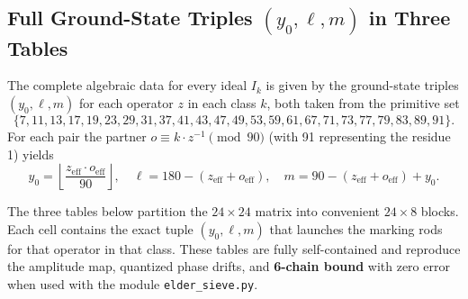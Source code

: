 \documentclass[11pt,a4paper]{article}
\begin{document}
\subsection{Full Ground-State Triples \((y_0, \ell, m)\) in Three  \) Tables}

The complete algebraic data for every ideal \(I_k\) is given by the ground-state triples \((y_0, \ell, m)\) for each operator \(z\) in each class \(k\), both taken from the primitive set
\[
\{7,11,13,17,19,23,29,31,37,41,43,47,49,53,59,61,67,71,73,77,79,83,89,91\}.
\]
For each pair the partner \(o \equiv k \cdot z^{-1} \pmod{90}\) (with 91 representing the residue 1) yields
\[
y_0 = \left\lfloor \frac{z_{\mathrm{eff}} \cdot o_{\mathrm{eff}}}{90} \right\rfloor, \quad
\ell = 180 - (z_{\mathrm{eff}} + o_{\mathrm{eff}}), \quad
m = 90 - (z_{\mathrm{eff}} + o_{\mathrm{eff}}) + y_0.
\]







The three tables below partition the \(24 \times 24\) matrix into convenient \(24 \times 8\) blocks. Each cell contains the exact tuple \((y_0, \ell, m)\) that launches the marking rods for that operator in that class. These tables are fully self-contained and reproduce the amplitude map, quantized phase drifts, and \textbf{6-chain bound }with zero error when used with the module \texttt{elder\_sieve.py}.
\end{document}
